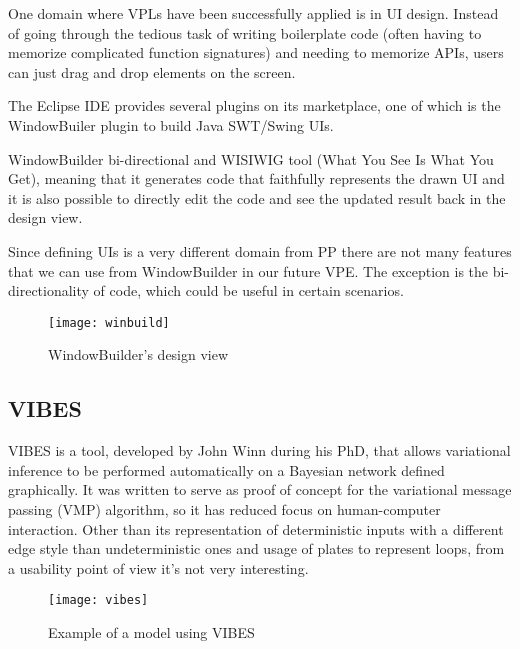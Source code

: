 One domain where VPLs have been successfully applied is in UI design. Instead of
going through the tedious task of writing boilerplate code (often having to
memorize complicated function signatures) and needing to memorize APIs, users
can just drag and drop elements on the screen.

The Eclipse IDE provides several plugins on its marketplace, one of which is the
WindowBuiler plugin \cite{winbuild} to build Java SWT/Swing UIs.

WindowBuilder bi-directional and WISIWIG tool (What You See Is What You Get), meaning
that it generates code that faithfully represents the drawn UI and it is also possible to
directly edit the code and see the updated result back in the design view.

Since defining UIs is a very different domain from PP there are not many features
that we can use from WindowBuilder in our future VPE. The exception is the
bi-directionality of code, which could be useful in certain scenarios.

\begin{figure}[t]
  \begin{center}
    \leavevmode
    \texttt{[image: winbuild]}
    \caption{WindowBuilder's design view \cite{winbuild}}
    \label{fig:winbuild}
  \end{center}
\end{figure}

\subsection{VIBES}
\label{sec:vibes}

VIBES is a tool, developed by John Winn during his PhD, that allows variational
inference to be performed automatically on a Bayesian network \cite{Winn2005}
defined graphically.
It was written to serve as proof of concept for the variational message passing (VMP)
algorithm, so it has reduced focus on human-computer interaction. Other than its representation
of deterministic inputs with a different edge style than undeterministic ones and
usage of plates to represent loops, from a usability point of view it's not very interesting.

\begin{figure}[t]
  \begin{center}
    \leavevmode
    \texttt{[image: vibes]}
    \caption{Example of a model using VIBES \cite{Winn2005}}
    \label{fig:vibes}
  \end{center}
\end{figure}

